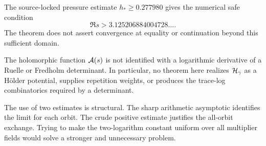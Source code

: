 The source-locked pressure estimate $h_*\ge0.277980$ gives the numerical
safe condition
\begin{equation}
 \Re s>3.125206884004728\ldots .
 \label{eq:sigma-numeric}
\end{equation}
The theorem does not assert convergence at equality or continuation beyond
this sufficient domain.

\begin{remark}
The holomorphic function $\mathcal A(s)$ is not identified with a logarithmic
derivative of a Ruelle or Fredholm determinant.  In particular, no theorem
here realizes $\mathcal H_\gamma$ as a H\"older potential, supplies repetition
weights, or produces the trace-log combinatorics required by a determinant.
\end{remark}

The use of two estimates is structural.  The sharp arithmetic asymptotic
identifies the limit for each orbit.  The crude positive estimate justifies
the all-orbit exchange.  Trying to make the two-logarithm constant uniform
over all multiplier fields would solve a stronger and unnecessary problem.
